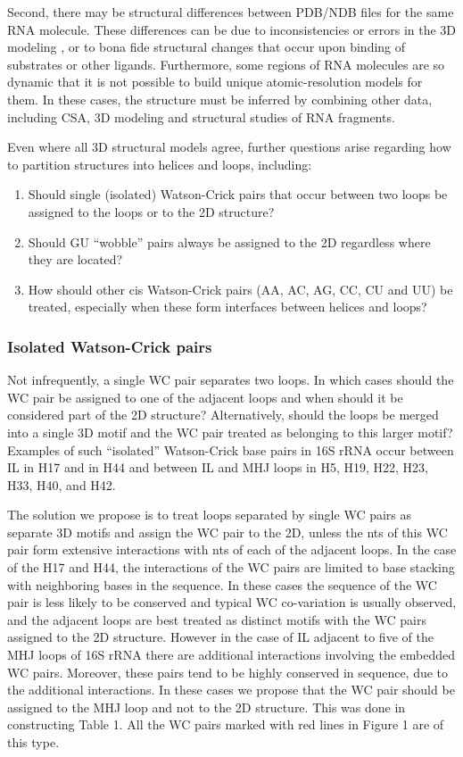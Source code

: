 Second, there may be structural differences between PDB/NDB files for the same
RNA molecule. These differences can be due to inconsistencies or errors in the
3D modeling \cite{Stombaugh2009}, or to bona fide structural changes that occur
upon binding of substrates or other ligands. Furthermore, some regions of RNA
molecules are so dynamic that it is not possible to build unique
atomic-resolution models for them. In these cases, the structure must be
inferred by combining other data, including CSA, 3D modeling and structural
studies of RNA fragments. 

Even where all 3D structural models agree, further questions arise regarding how
to partition structures into helices and loops, including:

\begin{enumerate}
  \item Should single (isolated) Watson-Crick pairs that occur between two loops
    be assigned to the loops or to the 2D structure? 

  \item Should GU ``wobble'' pairs always be assigned to the 2D regardless where
    they are located? 

  \item How should other cis Watson-Crick pairs (AA, AC, AG, CC, CU and UU) be
    treated, especially when these form interfaces between helices and loops? 
\end{enumerate}

\subsubsection{Isolated Watson-Crick pairs}

Not infrequently, a single WC pair separates two loops. In which cases should
the WC pair be assigned to one of the adjacent loops and when should it be
considered part of the 2D structure? Alternatively, should the loops be merged
into a single 3D motif and the WC pair treated as belonging to this larger
motif? Examples of such “isolated” Watson-Crick base pairs in 16S rRNA occur
between IL in H17 and in H44 and between IL and MHJ loops in H5, H19, H22, H23,
H33, H40, and H42. 

The solution we propose is to treat loops separated by single WC pairs as
separate 3D motifs and assign the WC pair to the 2D, unless the nts of this WC
pair form extensive interactions with nts of each of the adjacent loops. In the
case of the H17 and H44, the interactions of the WC pairs are limited to base
stacking with neighboring bases in the sequence. In these cases the sequence of
the WC pair is less likely to be conserved and typical WC co-variation is
usually observed, and the adjacent loops are best treated as distinct motifs
with the WC pairs assigned to the 2D structure. However in the case of IL
adjacent to five of the MHJ loops of 16S rRNA there are additional interactions
involving the embedded WC pairs. Moreover, these pairs tend to be highly
conserved in sequence, due to the additional interactions. In these cases we
propose that the WC pair should be assigned to the MHJ loop and not to the 2D
structure. This was done in constructing Table 1. All the WC pairs marked with
red lines in Figure 1 are of this type. 


